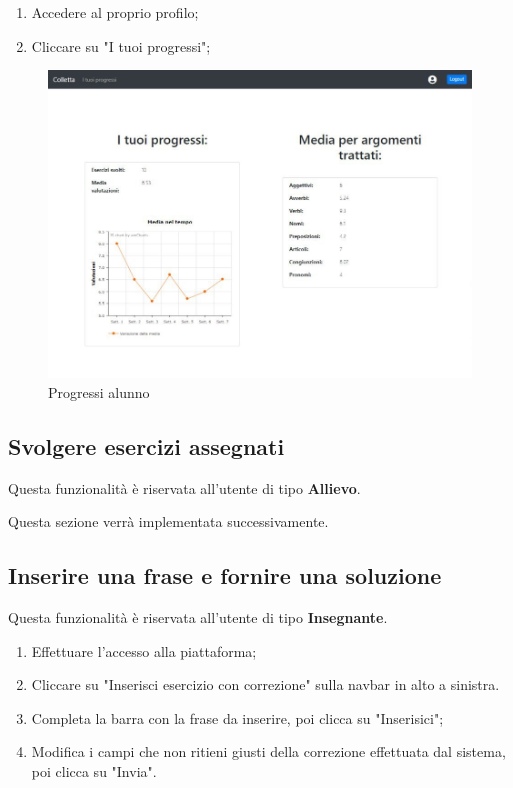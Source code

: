\documentclass[11pt,a4paper]{article}
\begin{document}
{	\begin{enumerate}
		\item Accedere al proprio profilo;
		\item Cliccare su "I tuoi progressi";
	\end{enumerate}
	\newpage
\begin{figure}[h]
		\centering
		\includegraphics[scale=0.65]{images/progressi.jpg}
		\caption{Progressi alunno}
	\end{figure}	
	
	\subsection{Svolgere esercizi assegnati}
	Questa funzionalità è riservata all'utente di tipo \textbf{Allievo}.
	
	Questa sezione verrà implementata successivamente.
		
	\subsection{Inserire una frase e fornire una soluzione}
			Questa funzionalità è riservata all'utente di tipo \textbf{Insegnante}.
			\begin{enumerate}
				\item Effettuare l'accesso alla piattaforma;
				\item Cliccare su "Inserisci esercizio con correzione" sulla navbar in alto a sinistra.
				\item Completa la barra con la frase da inserire, poi clicca su "Inserisici";
				\item Modifica i campi che non ritieni giusti della correzione effettuata dal sistema, poi clicca su "Invia". 
			\end{enumerate}

}
\end{document}

